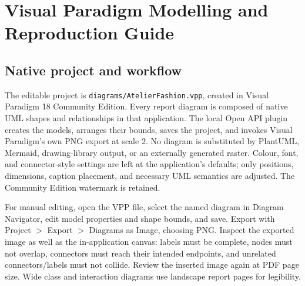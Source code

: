 \chapter{Visual Paradigm Modelling and Reproduction Guide}
\section{Native project and workflow}
The editable project is \texttt{diagrams/AtelierFashion.vpp}, created in Visual Paradigm 18 Community Edition. Every report diagram is composed of native UML shapes and relationships in that application. The local Open API plugin creates the models, arranges their bounds, saves the project, and invokes Visual Paradigm's own PNG export at scale 2. No diagram is substituted by PlantUML, Mermaid, drawing-library output, or an externally generated raster. Colour, font, and connector-style settings are left at the application's defaults; only positions, dimensions, caption placement, and necessary UML semantics are adjusted. The Community Edition watermark is retained.

For manual editing, open the VPP file, select the named diagram in Diagram Navigator, edit model properties and shape bounds, and save. Export with Project $>$ Export $>$ Diagrams as Image, choosing PNG. Inspect the exported image as well as the in-application canvas: labels must be complete, nodes must not overlap, connectors must reach their intended endpoints, and unrelated connectors/labels must not collide. Review the inserted image again at PDF page size. Wide class and interaction diagrams use landscape report pages for legibility.

